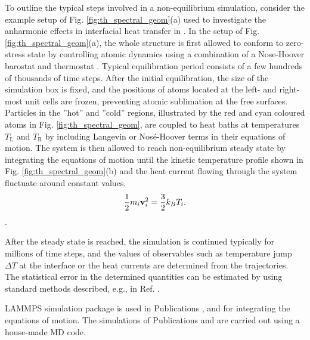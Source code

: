 To outline the typical steps involved in a non-equilibrium simulation, consider the example setup of Fig. \ref{fig:th_spectral_geom}(a) used to investigate the anharmonic effects in interfacial heat transfer in . In the setup of Fig. \ref{fig:th_spectral_geom}(a), the whole structure is first allowed to conform to zero-stress state by controlling atomic dynamics using a combination of a Nose-Hoover barostat and thermostat \cite{allentildesley}. Typical equilibration period consists of a few hundreds of thousands of time steps. After the initial equilibration, the size of the simulation box is fixed, and the positions of atoms located at the left- and right-most unit cells are frozen, preventing atomic sublimation at the free surfaces. Particles in the ''hot'' and ''cold'' regions, illustrated by the red and cyan coloured atoms in Fig. \ref{fig:th_spectral_geom}, are coupled to heat baths at temperatures $T_{\textrm{L}}$ and $T_{\textrm{R}}$ by including Langevin or Nos\'e-Hoover terms in their equations of motion. The system is then allowed to reach non-equilibrium steady state by integrating the equations of motion until the kinetic temperature profile shown in Fig. \ref{fig:th_spectral_geom}(b) and the heat current flowing through the system fluctuate around constant values.  \cite{allentildesley}
\begin{equation}
 \frac{1}{2} m_i \mathbf{v}_i^2 = \frac{3}{2} k_B T_i.
\end{equation}
. 

After the steady state is reached, the simulation is continued typically for millions of time steps, and the values of observables such as temperature jump $\Delta T$ at the interface or the heat currents are determined from the trajectories. The statistical error in the determined quantities can be estimated by using standard methods described, e.g., in Ref. \cite{allentildesley}.

LAMMPS simulation package \cite{plimpton95} is used in Publications ,  and  for integrating the equations of motion. The simulations of Publications  and  are carried out using a house-made MD code. 

